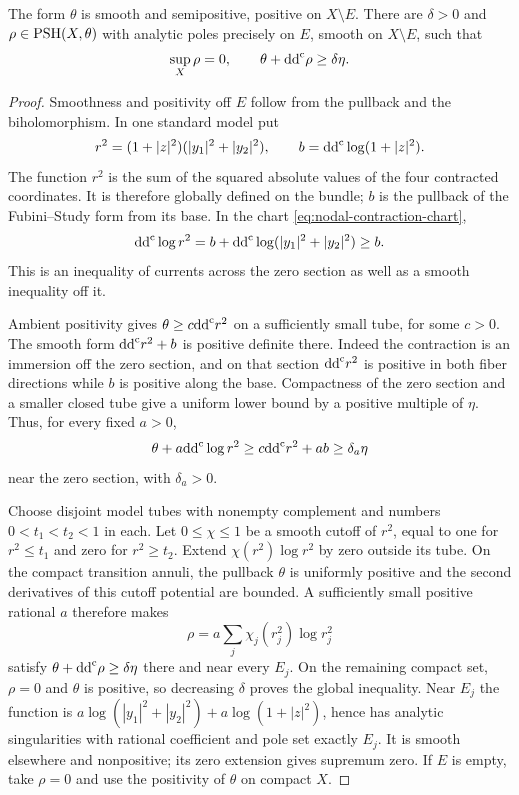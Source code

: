 \begin{lemma}\label{lem:nodal-strict-barrier}
The form $\theta$ is smooth and semipositive, positive on $X\setminus E$. There are $\delta>0$ and $\rho\in\mathrm{PSH}(X,\theta)$ with analytic poles precisely on $E$, smooth on $X\setminus E$, such that
\[
 \sup_X\rho=0,\qquad \theta+\mathrm{dd}^{\mathrm{c}}\rho\geq\delta\eta.
\]
\end{lemma}
\begin{proof}
Smoothness and positivity off $E$ follow from the pullback and the biholomorphism. In one standard model put
\[
 r^2=(1+|z|^2)(|y_1|^2+|y_2|^2),\qquad
 b=\mathrm{dd}^{\mathrm{c}}\log(1+|z|^2).
\]
The function $r^2$ is the sum of the squared absolute values of the four contracted coordinates. It is therefore globally defined on the bundle; $b$ is the pullback of the Fubini--Study form from its base. In the chart \eqref{eq:nodal-contraction-chart},
\begin{equation}\label{eq:nodal-logarithmic-curvature}
 \mathrm{dd}^{\mathrm{c}}\log r^2
 =b+\mathrm{dd}^{\mathrm{c}}\log(|y_1|^2+|y_2|^2)\geq b.
\end{equation}
This is an inequality of currents across the zero section as well as a smooth inequality off it.

Ambient positivity gives $\theta\geq c\mathrm{dd}^{\mathrm{c}} r^2$ on a sufficiently small tube, for some $c>0$. The smooth form $\mathrm{dd}^{\mathrm{c}} r^2+b$ is positive definite there. Indeed the contraction is an immersion off the zero section, and on that section $\mathrm{dd}^{\mathrm{c}} r^2$ is positive in both fiber directions while $b$ is positive along the base. Compactness of the zero section and a smaller closed tube give a uniform lower bound by a positive multiple of $\eta$. Thus, for every fixed $a>0$,
\[
 \theta+a\mathrm{dd}^{\mathrm{c}}\log r^2
 \geq c\mathrm{dd}^{\mathrm{c}} r^2+ab
 \geq\delta_a\eta
\]
near the zero section, with $\delta_a>0$.

Choose disjoint model tubes with nonempty complement and numbers $0<t_1<t_2<1$ in each. Let $0\leq\chi\leq1$ be a smooth cutoff of $r^2$, equal to one for $r^2\leq t_1$ and zero for $r^2\geq t_2$. Extend $\chi(r^2)\log r^2$ by zero outside its tube. On the compact transition annuli, the pullback $\theta$ is uniformly positive and the second derivatives of this cutoff potential are bounded. A sufficiently small positive rational $a$ therefore makes
\[
 \rho=a\sum_j\chi_j(r_j^2)\log r_j^2
\]
satisfy $\theta+\mathrm{dd}^{\mathrm{c}}\rho\geq\delta\eta$ there and near every $E_j$. On the remaining compact set, $\rho=0$ and $\theta$ is positive, so decreasing $\delta$ proves the global inequality. Near $E_j$ the function is
$a\log(|y_1|^2+|y_2|^2)+a\log(1+|z|^2)$, hence has analytic singularities with rational coefficient and pole set exactly $E_j$. It is smooth elsewhere and nonpositive; its zero extension gives supremum zero. If $E$ is empty, take $\rho=0$ and use the positivity of $\theta$ on compact $X$.
\end{proof}

